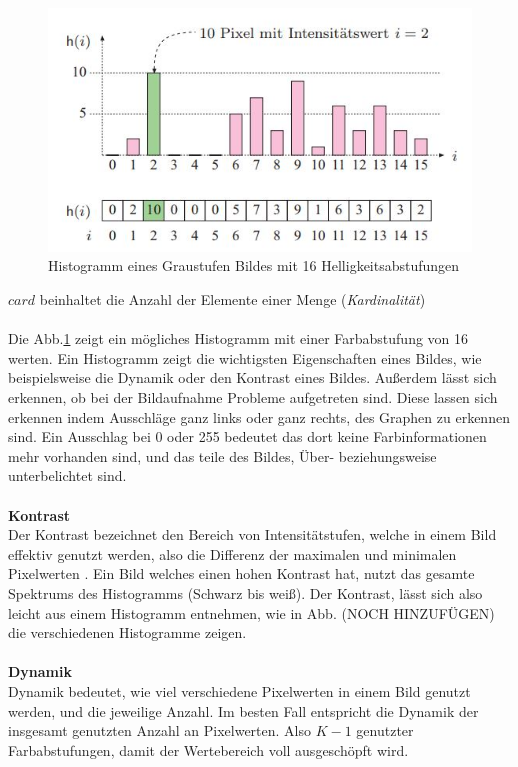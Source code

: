 \documentclass[a4paper,12pt,oneside]{article}
\begin{document}
\begin{figure}
	[h]
	\centering
	\includegraphics[scale=1.0]{Sources/histogramm.jpg}
	\caption{Histogramm eines Graustufen Bildes mit 16 Helligkeitsabstufungen \cite[42]{burger2009digitale}}
	\label{img:histogramm}
\end{figure}
$card$ beinhaltet die Anzahl der Elemente einer Menge (\textit{Kardinalität})\\\\
Die Abb.\ref{img:histogramm} zeigt ein mögliches Histogramm mit einer Farbabstufung von 16 werten. Ein Histogramm zeigt die wichtigsten Eigenschaften eines Bildes, wie beispielsweise die Dynamik oder den Kontrast eines Bildes. Außerdem lässt sich erkennen, ob bei der Bildaufnahme Probleme aufgetreten sind. Diese lassen sich erkennen indem Ausschläge ganz links oder ganz rechts, des Graphen zu erkennen sind. Ein Ausschlag bei 0 oder 255 bedeutet das dort keine Farbinformationen mehr vorhanden sind, und das teile des Bildes, Über- beziehungsweise unterbelichtet sind.\\\\
\textbf{Kontrast}\label{s.kontrast}\\
Der Kontrast bezeichnet den Bereich von Intensitätstufen, welche in einem Bild effektiv genutzt werden, also die Differenz der maximalen und minimalen Pixelwerten \cite[44]{burger2009digitale}. Ein Bild welches einen hohen Kontrast hat, nutzt das gesamte Spektrums des Histogramms (Schwarz bis weiß). Der Kontrast, lässt sich also leicht aus einem Histogramm entnehmen, wie in Abb. (NOCH HINZUFÜGEN) die verschiedenen Histogramme zeigen.\\\\
\textbf{Dynamik}\label{s.dynamik}\\
Dynamik bedeutet, wie viel verschiedene Pixelwerten in einem Bild genutzt werden, und die jeweilige Anzahl\cite[44]{burger2009digitale}. Im besten Fall entspricht die Dynamik der insgesamt genutzten Anzahl an Pixelwerten. Also $K-1$ genutzter Farbabstufungen, damit der Wertebereich voll ausgeschöpft wird.\\\\
\end{document}
